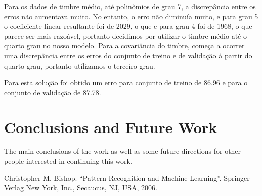 \documentclass[conference]{IEEEtran}
\begin{document}
Para os dados de timbre médio, até polinômios de grau 7, a discrepância entre os erros não aumentava muito. No entanto, o erro não diminuía muito, e para grau 5 o coeficiente linear resultante foi de 2029, o que e para grau 4 foi de 1968, o que parece ser mais razoável, portanto decidimos por utilizar o timbre médio até o quarto grau no nosso modelo. Para a covariância do timbre, começa a ocorrer uma discrepância entre os erros do conjunto de treino e de validação à partir do quarto grau, portanto utilizamos o terceiro grau.

Para esta solução foi obtido um erro para conjunto de treino de 86.96 e para o conjunto de validação de 87.78. 

\section{Conclusions and Future Work}

The main conclusions of the work as well as some future directions for other people interested in continuing this work. 

\begin{thebibliography}{00}
 Christopher M. Bishop. ``Pattern Recognition and Machine Learning''. Springer-Verlag New York, Inc., Secaucus, NJ, USA, 2006. 
\end{thebibliography}
\end{document}
